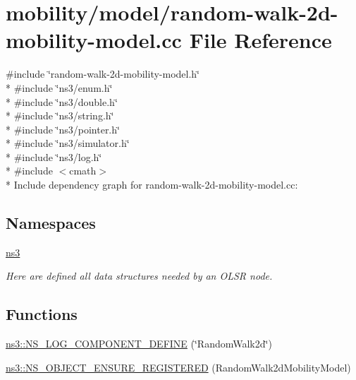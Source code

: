 \hypertarget{random-walk-2d-mobility-model_8cc}{}\section{mobility/model/random-\/walk-\/2d-\/mobility-\/model.cc File Reference}
\label{random-walk-2d-mobility-model_8cc}
{\ttfamily \#include \char`\"{}random-\/walk-\/2d-\/mobility-\/model.\+h\char`\"{}}\\*
{\ttfamily \#include \char`\"{}ns3/enum.\+h\char`\"{}}\\*
{\ttfamily \#include \char`\"{}ns3/double.\+h\char`\"{}}\\*
{\ttfamily \#include \char`\"{}ns3/string.\+h\char`\"{}}\\*
{\ttfamily \#include \char`\"{}ns3/pointer.\+h\char`\"{}}\\*
{\ttfamily \#include \char`\"{}ns3/simulator.\+h\char`\"{}}\\*
{\ttfamily \#include \char`\"{}ns3/log.\+h\char`\"{}}\\*
{\ttfamily \#include $<$cmath$>$}\\*
Include dependency graph for random-\/walk-\/2d-\/mobility-\/model.cc\+:
\subsection*{Namespaces}
\begin{DoxyCompactItemize}
\item 
 \hyperlink{namespacens3}{ns3}
\begin{DoxyCompactList}\small\item\em Here are defined all data structures needed by an O\+L\+SR node. \end{DoxyCompactList}\end{DoxyCompactItemize}
\subsection*{Functions}
\begin{DoxyCompactItemize}
\item 
\hyperlink{namespacens3_af41bfb704106452914de5b50a4de347f}{ns3\+::\+N\+S\+\_\+\+L\+O\+G\+\_\+\+C\+O\+M\+P\+O\+N\+E\+N\+T\+\_\+\+D\+E\+F\+I\+NE} (\char`\"{}Random\+Walk2d\char`\"{})
\item 
\hyperlink{namespacens3_ad20624bf85638d70311fd6ca8d735c59}{ns3\+::\+N\+S\+\_\+\+O\+B\+J\+E\+C\+T\+\_\+\+E\+N\+S\+U\+R\+E\+\_\+\+R\+E\+G\+I\+S\+T\+E\+R\+ED} (Random\+Walk2d\+Mobility\+Model)
\end{DoxyCompactItemize}
